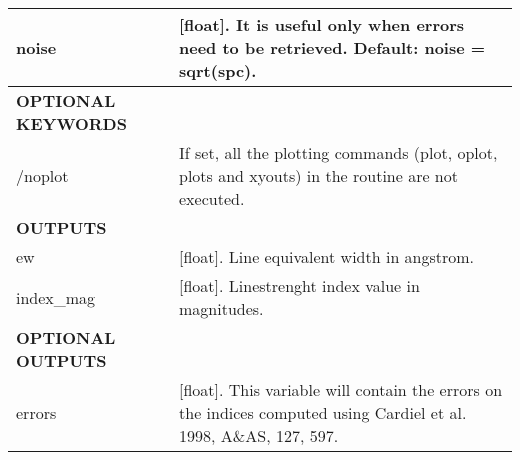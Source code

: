 \begin{center}
\begin{longtable}{p{2.7cm}| p{11.1cm}}
%
noise    & [float].   It is useful only when errors need to be retrieved. Default: noise = sqrt(spc).\\ 
\hline
{\bf OPTIONAL KEYWORDS}  & \\
\hline
/noplot     &         If set, all the plotting commands (plot, oplot, plots and xyouts) in the routine are not executed.\\
{\bf OUTPUTS} & \\
\hline
ew         &[float].    Line equivalent width in angstrom.\\
%
index\_mag &[float].    Linestrenght index value in magnitudes.\\
%
\hline
{\bf OPTIONAL OUTPUTS} & \\
\hline
errors    &[float].    This variable will contain the errors on the indices computed using Cardiel et al. 1998, A\&AS, 127, 597.\\
\hline
\hline
\end{longtable}
\end{center}




